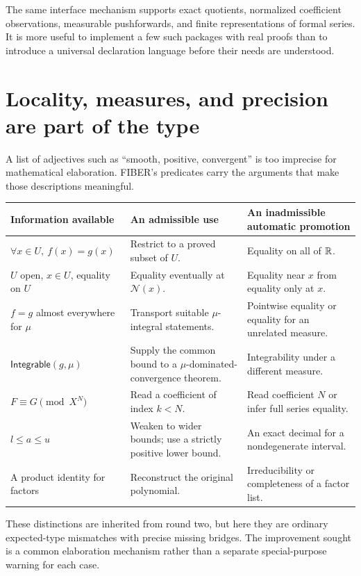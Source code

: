 \documentclass[11pt,letterpaper]{article}
\theoremstyle{definition}\newtheorem{definition}[theorem]{Definition}
\newcommand{\neart}[1]{\mathcal N(#1)}
\begin{document}
The same interface mechanism supports exact quotients, normalized coefficient observations, measurable pushforwards, and finite representations of formal series. It is more useful to implement a few such packages with real proofs than to introduce a universal declaration language before their needs are understood.

\section{Locality, measures, and precision are part of the type}\label{sec:scope}
A list of adjectives such as ``smooth, positive, convergent'' is too imprecise for mathematical elaboration. FIBER's predicates carry the arguments that make those descriptions meaningful.
\begin{center}\small
\begin{tabularx}{\textwidth}{@{}L{1.7in}YY@{}}
\toprule
Information available & An admissible use & An inadmissible automatic promotion\\\midrule
$\forall x\in U,\ f(x)=g(x)$ & Restrict to a proved subset of $U$. & Equality on all of $\mathbb R$.\\
$U$ open, $x\in U$, equality on $U$ & Equality eventually at $\neart{x}$. & Equality near $x$ from equality only at $x$.\\
$f=g$ almost everywhere for $\mu$ & Transport suitable $\mu$-integral statements. & Pointwise equality or equality for an unrelated measure.\\
$\mathsf{Integrable}(g,\mu)$ & Supply the common bound to a $\mu$-dominated-convergence theorem. & Integrability under a different measure.\\
$F\equiv G\pmod{X^N}$ & Read a coefficient of index $k<N$. & Read coefficient $N$ or infer full series equality.\\
$l\le a\le u$ & Weaken to wider bounds; use a strictly positive lower bound. & An exact decimal for a nondegenerate interval.\\
A product identity for factors & Reconstruct the original polynomial. & Irreducibility or completeness of a factor list.\\
\bottomrule
\end{tabularx}
\end{center}
These distinctions are inherited from round two, but here they are ordinary expected-type mismatches with precise missing bridges. The improvement sought is a common elaboration mechanism rather than a separate special-purpose warning for each case.
\end{document}
